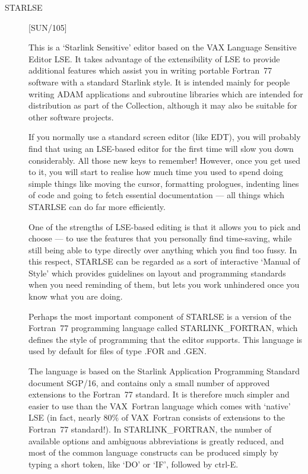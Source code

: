 \begin{description}
\item [STARLSE] \hfill [SUN/105]

This is a `Starlink Sensitive' editor based on the \mbox{VAX} Language
Sensitive Editor \mbox{LSE}.
It takes advantage of the extensibility of \mbox{LSE} to provide additional
features which assist you in writing portable Fortran~77 software with a
standard Starlink style. 
It is intended mainly for people writing \mbox{ADAM} applications and
subroutine libraries which are intended for distribution as part of the
Collection, although it may also be suitable for other software projects. 

If you normally use a standard screen editor (like EDT), you will probably find
that using an \mbox{LSE}-based editor for the first time will slow you down
considerably. 
All those new keys to remember!
However, once you get used to it, you will start to realise how much time
you used to spend doing simple things like moving the cursor, formatting
prologues, indenting lines of code and going to fetch essential
documentation --- all things which \mbox{STARLSE} can do far more
efficiently. 

One of the strengths of \mbox{LSE}-based editing is that it allows
you to pick and choose --- to use the features that you personally find
time-saving, while still being able to type directly over anything which you
find too fussy. 
In this respect, \mbox{STARLSE} can be regarded as a sort of interactive
`Manual of Style' which provides guidelines on layout and programming
standards when you need reminding of them, but lets you work unhindered once
you know what you are doing. 

Perhaps the most important component of \mbox{STARLSE} is a version of the
Fortran~77 programming language called \mbox{STARLINK\_FORTRAN}, which
defines the style of programming that the editor supports. 
This language is used by default for files of type \mbox{.FOR} and
\mbox{.GEN}. 

The language is based on the Starlink Application Programming Standard
document SGP/16, and contains only a small number of approved extensions to
the Fortran~77 standard. 
It is therefore much simpler and easier to use than the \mbox{VAX}~Fortran
language which comes with `native' \mbox{LSE} (in fact, nearly 80\% of
\mbox{VAX}~Fortran consists of extensions to the Fortran~77 standard!). 
In \mbox{STARLINK\_FORTRAN}, the number of available options and ambiguous
abbreviations is greatly reduced, and most of the common language constructs
can be produced simply by typing a short token, like `DO' or `IF', followed
by \mbox{ctrl-E}. 


\end{description}

